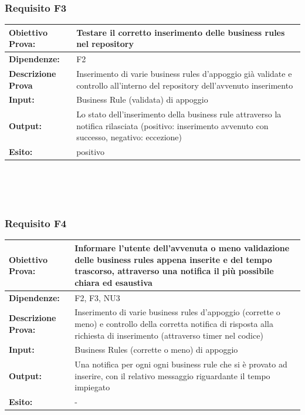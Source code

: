 \documentclass[11pt,titlepage,a4paper]{report}
\begin{document}
\subsubsection{Requisito F3}
\begin{tabular}{||p{4.5cm}||p{7.5cm}||}
\hline
{\textbf {Obiettivo Prova:}}& Testare il corretto inserimento delle business rules nel repository\\ \hline
{\textbf{Dipendenze:}}& F2 \\ \hline
{\textbf{Descrizione Prova}}&  Inserimento di varie business rules d'appoggio gi\`a validate e controllo all'interno del repository dell'avvenuto inserimento\\ \hline
{\textbf{Input:}}& Business Rule (validata) di appoggio \\ \hline
{\textbf{Output:}}& Lo stato dell'inserimento della business rule attraverso la notifica rilasciata (positivo: inserimento avvenuto con successo, negativo: eccezione) \\ \hline
{\textbf{Esito:}}& positivo\\ \hline
\end{tabular} \\
\\
\\
\subsubsection{Requisito F4}
\begin{tabular}{||p{4.5cm}||p{7.5cm}||}
\hline
{\textbf {Obiettivo Prova:}}& Informare l'utente dell'avvenuta o meno validazione delle business rules appena inserite e del tempo trascorso, attraverso una notifica il pi\`u possibile chiara ed esaustiva\\ \hline
{\textbf{Dipendenze:}} & F2, F3, NU3 \\ \hline
{\textbf{Descrizione Prova:}}& Inserimento di varie business rules d'appoggio (corrette o meno) e controllo della corretta notifica di risposta alla richiesta di inserimento (attraverso timer nel codice) \\ \hline
{\textbf{Input:}}& Business Rules (corrette o meno) di appoggio  \\ \hline
{\textbf{Output:}}& Una notifica per ogni ogni business rule che si \`e provato ad inserire, con il relativo messaggio riguardante il tempo impiegato \\ \hline
{\textbf{Esito:}}& -  \\ \hline
\end{tabular} \\
\\
\\
\end{document}
